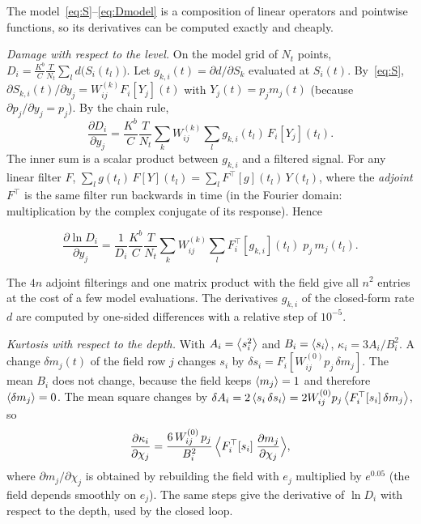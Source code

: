 The model~\eqref{eq:S}--\eqref{eq:Dmodel} is a composition of linear operators and pointwise
functions, so its derivatives can be computed exactly and cheaply.

\emph{Damage with respect to the level.} On the model grid of $N_t$ points, $D_i =
\frac{K^b}{C}\frac{T}{N_t}\sum_l d\bigl(S_i(t_l)\bigr)$. Let $g_{k,i}(t) = \partial d/\partial
S_k$ evaluated at $S_i(t)$. By~\eqref{eq:S}, $\partial S_{k,i}(t)/\partial y_j = W^{(k)}_{ij}
F_i[Y_j](t)$ with $Y_j(t) = p_jm_j(t)$ (because $\partial p_j/\partial y_j = p_j$). By the chain rule,
\begin{equation}
  \frac{\partial D_i}{\partial y_j} = \frac{K^b}{C}\frac{T}{N_t}\sum_k W^{(k)}_{ij}\sum_l g_{k,i}(t_l)\,F_i[Y_j](t_l).
\end{equation}
The inner sum is a scalar product between $g_{k,i}$ and a filtered signal. For any linear filter
$F$, $\sum_l g(t_l)\,F[Y](t_l) = \sum_l F^{\top}[g](t_l)\,Y(t_l)$, where the \emph{adjoint} $F^{\top}$ is
the same filter run backwards in time (in the Fourier domain: multiplication by the complex conjugate
of its response). Hence
\begin{result}
\begin{equation}
  \frac{\partial\ln D_i}{\partial y_j} = \frac{1}{D_i}\frac{K^b}{C}\frac{T}{N_t}
  \sum_k W^{(k)}_{ij}\sum_l F_i^{\top}[g_{k,i}](t_l)\;p_j\,m_j(t_l).
\end{equation}
\end{result}
The $4n$ adjoint filterings and one matrix product with the field give all $n^2$ entries at the cost
of a few model evaluations. The derivatives $g_{k,i}$ of the closed-form rate $d$ are computed by
one-sided differences with a relative step of $10^{-5}$.

\emph{Kurtosis with respect to the depth.} With $A_i = \left\langle s_i^2 \right\rangle$ and $B_i = \left\langle s_i \right\rangle$,
$\kappa_i = 3A_i/B_i^2$. A change $\delta m_j(t)$ of the field row $j$ changes $s_i$ by $\delta s_i
= F_i[W^{(0)}_{ij}p_j\,\delta m_j]$. The mean $B_i$ does not change, because the field keeps
$\left\langle m_j \right\rangle = 1$ and therefore $\left\langle \delta m_j \right\rangle = 0$. The mean square changes by
$\delta A_i = 2\left\langle s_i\,\delta s_i \right\rangle = 2W^{(0)}_{ij}p_j\left\langle F_i^{\top}[s_i]\,\delta m_j \right\rangle$, so
\begin{equation}
  \frac{\partial\kappa_i}{\partial\chi_j} = \frac{6\,W^{(0)}_{ij}\,p_j}{B_i^2}\,
  \Bigl\langle F_i^{\top}[s_i]\;\frac{\partial m_j}{\partial\chi_j}\Bigr\rangle ,
\end{equation}
where $\partial m_j/\partial\chi_j$ is obtained by rebuilding the field with $e_j$ multiplied by
$e^{0.05}$ (the field depends smoothly on $e_j$). The same steps give the derivative of $\ln D_i$ with
respect to the depth, used by the closed loop.

